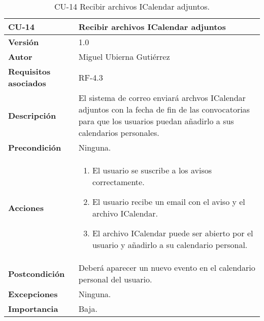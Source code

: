 \begin{table}[p]
	\centering
	\begin{tabularx}{\linewidth}{ p{} p{} }
		\toprule
		\textbf{CU-14}    & \textbf{Recibir archivos ICalendar adjuntos}\\
		\toprule
		\textbf{Versión}              & 1.0    \\
		\textbf{Autor}                & Miguel Ubierna Gutiérrez \\
		\textbf{Requisitos asociados} & RF-4.3  \\
		\textbf{Descripción}          & El sistema de correo enviará archvos ICalendar adjuntos con la fecha de fin de las convocatorias para que los usuarios puedan añadirlo a sus calendarios personales.  \\
		\textbf{Precondición}         & Ninguna.\\
		\textbf{Acciones}             &
		\begin{enumerate}
			\def\labelenumi{\arabic{enumi}.}
			\tightlist
			\item El usuario se suscribe a los avisos correctamente.
                \item El usuario recibe un email con el aviso y el archivo ICalendar.
                \item El archivo ICalendar puede ser abierto por el usuario y añadirlo a su calendario personal.
		\end{enumerate}\\
		\textbf{Postcondición}        & Deberá aparecer un nuevo evento en el calendario personal del usuario. \\
		\textbf{Excepciones}          & Ninguna. \\
		\textbf{Importancia}          & Baja.  \\
		\bottomrule
	\end{tabularx}
	\caption{CU-14 Recibir archivos ICalendar adjuntos.}
\end{table}


